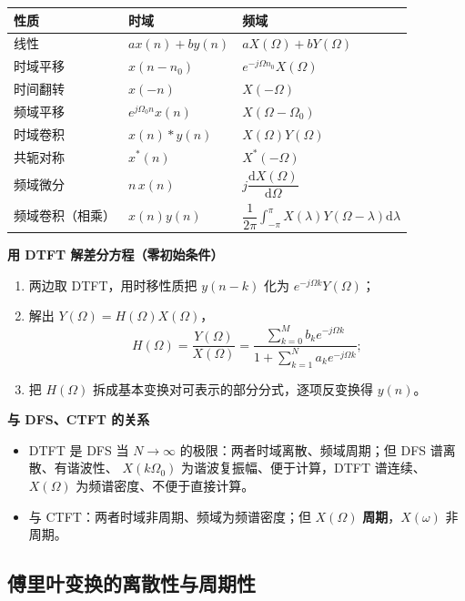 \begin{center}
\begin{tabular}{lll}
\toprule
性质 & 时域 & 频域 \\
\midrule
线性 & $ax(n)+by(n)$ & $aX(\Omega)+bY(\Omega)$ \\
时域平移 & $x(n-n_0)$ & $e^{-j\Omega n_0}X(\Omega)$ \\
时间翻转 & $x(-n)$ & $X(-\Omega)$ \\
频域平移 & $e^{j\Omega_0 n}x(n)$ & $X(\Omega-\Omega_0)$ \\
时域卷积 & $x(n)*y(n)$ & $X(\Omega)Y(\Omega)$ \\
共轭对称 & $x^*(n)$ & $X^*(-\Omega)$ \\
频域微分 & $n\,x(n)$ & $j\dfrac{\mathrm{d}X(\Omega)}{\mathrm{d}\Omega}$ \\
频域卷积（相乘） & $x(n)y(n)$ & $\dfrac{1}{2\pi}\displaystyle\int_{-\pi}^{\pi}X(\lambda)Y(\Omega-\lambda)\mathrm{d}\lambda$ \\
\bottomrule
\end{tabular}
\end{center}

\textbf{用 DTFT 解差分方程（零初始条件）}
\begin{enumerate}
\item 两边取 DTFT，用时移性质把 $y(n-k)$ 化为 $e^{-j\Omega k}Y(\Omega)$；
\item 解出 $Y(\Omega)=H(\Omega)X(\Omega)$，
\begin{equation}
H(\Omega)=\frac{Y(\Omega)}{X(\Omega)}=\frac{\sum\limits_{k=0}^{M}b_k e^{-j\Omega k}}{1+\sum\limits_{k=1}^{N}a_k e^{-j\Omega k}};
\end{equation}
\item 把 $H(\Omega)$ 拆成基本变换对可表示的部分分式，逐项反变换得 $y(n)$。
\end{enumerate}

\textbf{与 DFS、CTFT 的关系}
\begin{itemize}
\item DTFT 是 DFS 当 $N\to\infty$ 的极限：两者时域离散、频域周期；但 DFS 谱离散、有谐波性、
  $X(k\Omega_0)$ 为谐波复振幅、便于计算，DTFT 谱连续、$X(\Omega)$ 为频谱密度、不便于直接计算。
\item 与 CTFT：两者时域非周期、频域为频谱密度；但 $X(\Omega)$ \textbf{周期}，$X(\omega)$ 非周期。
\end{itemize}

\subsection{傅里叶变换的离散性与周期性}

